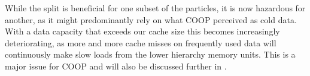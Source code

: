 While the split is beneficial for one subset of the particles, it is now hazardous for another, as it might predominantly rely on what COOP perceived as cold data. With a data capacity that exceeds our cache size this becomes increasingly deteriorating, as more and more cache misses on frequently used data will continuously make slow loads from the lower hierarchy memory units. This is a major issue for COOP and will also be discussed further in .





